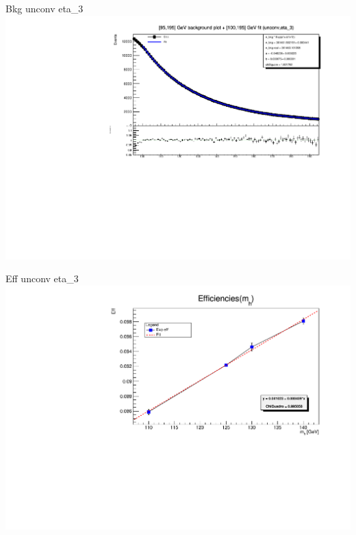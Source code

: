 \documentclass[10pt,UKenglish, leqno, xcolor = dvipsnames]{beamer}
\begin{document}
		\begin{frame}{Bkg unconv eta\_3}
			\vfill
			\centering
			\includegraphics[width=1.\textwidth]{../images/week_10/bkg_100_195GeV_fit_unconv_eta_3.pdf}
			\vfill
		\end{frame}
	
		\begin{frame}{Eff unconv eta\_3}
			\vfill
			\includegraphics[width=1.\textwidth]{../images/week_10/efficiencies_fit_unconv_eta_3.pdf}
			\vfill
		\end{frame}
	
\end{document}
